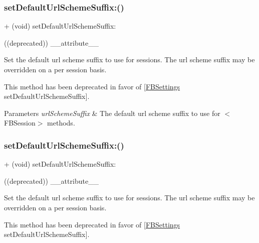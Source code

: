 \subsubsection{\texorpdfstring{set\+Default\+Url\+Scheme\+Suffix\+:()}{setDefaultUrlSchemeSuffix:()}\hspace{0.1cm}{\footnotesize\ttfamily [1/5]}}
{\footnotesize\ttfamily + (void) set\+Default\+Url\+Scheme\+Suffix\+: \begin{DoxyParamCaption}\item[{((deprecated))}]{\+\_\+\+\_\+attribute\+\_\+\+\_\+ }\end{DoxyParamCaption}}

Set the default url scheme suffix to use for sessions. The url scheme suffix may be overridden on a per session basis.

This method has been deprecated in favor of \mbox{[}\hyperlink{interfaceFBSettings}{F\+B\+Settings} set\+Default\+Url\+Scheme\+Suffix\mbox{]}.


\begin{DoxyParams}{Parameters}
{\em url\+Scheme\+Suffix} & The default url scheme suffix to use for $<$\+F\+B\+Session$>$ methods. \\
\hline
\end{DoxyParams}
\mbox{\label{interfaceFBSession_ac3d4f0df3cae8fe5091b9d98b9f166d4}} 
\subsubsection{\texorpdfstring{set\+Default\+Url\+Scheme\+Suffix\+:()}{setDefaultUrlSchemeSuffix:()}\hspace{0.1cm}{\footnotesize\ttfamily [2/5]}}
{\footnotesize\ttfamily + (void) set\+Default\+Url\+Scheme\+Suffix\+: \begin{DoxyParamCaption}\item[{((deprecated))}]{\+\_\+\+\_\+attribute\+\_\+\+\_\+ }\end{DoxyParamCaption}}

Set the default url scheme suffix to use for sessions. The url scheme suffix may be overridden on a per session basis.

This method has been deprecated in favor of \mbox{[}\hyperlink{interfaceFBSettings}{F\+B\+Settings} set\+Default\+Url\+Scheme\+Suffix\mbox{]}.


